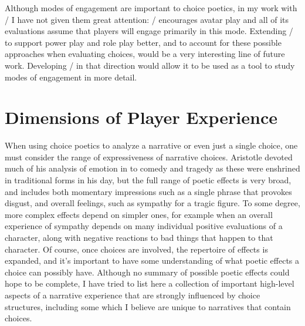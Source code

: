 Although modes of engagement are important to choice poetics, in my work with \dunyazad/ I have not given them great attention: \dunyazad/ encourages avatar play and all of its evaluations assume that players will engage primarily in this mode.
%
Extending \dunyazad/ to support power play and role play better, and to account for these possible approaches when evaluating choices, would be a very interesting line of future work.
%
Developing \dunyazad/ in that direction would allow it to be used as a tool to study modes of engagement in more detail.


\section{Dimensions of Player Experience}

When using choice poetics to analyze a narrative or even just a single choice, one must consider the range of expressiveness of narrative choices.
%
Aristotle devoted much of his analysis of emotion in  to comedy and tragedy as these were enshrined in traditional forms in his day, but the full range of poetic effects is very broad, and includes both momentary impressions such as a single phrase that provokes disgust, and overall feelings, such as sympathy for a tragic figure.
%
To some degree, more complex effects depend on simpler ones, for example when an overall experience of sympathy depends on many individual positive evaluations of a character, along with negative reactions to bad things that happen to that character.
%
Of course, once choices are involved, the repertoire of effects is expanded, and it's important to have some understanding of what poetic effects a choice can possibly have.
%
Although no summary of possible poetic effects could hope to be complete, I have tried to list here a collection of important high-level aspects of a narrative experience that are strongly influenced by choice structures, including some which I believe are unique to narratives that contain choices.



